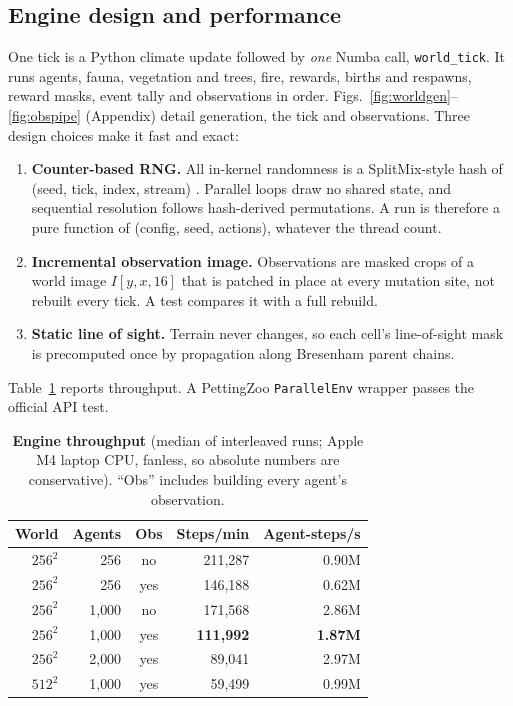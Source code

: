 \documentclass[10pt]{article}
\begin{document}
\subsection{Engine design and performance}
\label{sec:engine}
One tick is a Python climate update followed by \emph{one} Numba \citep{lam2015numba} call, \texttt{world\_tick}. It
runs agents, fauna, vegetation and trees, fire, rewards, births and respawns, reward masks, event tally and
observations in order. Figs.~\ref{fig:worldgen}--\ref{fig:obspipe} (Appendix) detail generation, the tick and observations.
Three design choices make it fast and exact:
\begin{enumerate}
\item \textbf{Counter-based RNG.} All in-kernel randomness is a SplitMix-style hash of
(seed, tick, index, stream) \citep{steele2014splitmix,salmon2011random}. Parallel loops draw no shared state, and
sequential resolution follows hash-derived permutations. A run is therefore a pure function of (config, seed,
actions), whatever the thread count.
\item \textbf{Incremental observation image.} Observations are masked crops of a world image $I[y,x,16]$ that is
patched in place at every mutation site, not rebuilt every tick. A test compares it with a full rebuild.
\item \textbf{Static line of sight.} Terrain never changes, so each cell's line-of-sight mask is precomputed once by
propagation along Bresenham parent chains.
\end{enumerate}
Table~\ref{tab:bench} reports throughput. A PettingZoo \texttt{ParallelEnv} wrapper \citep{terry2021pettingzoo}
passes the official API test.

\begin{table}[t]
\centering\small
\caption{\textbf{Engine throughput} (median of interleaved runs; Apple M4 laptop CPU, fanless, so absolute numbers
are conservative). ``Obs'' includes building every agent's observation.}
\label{tab:bench}
\begin{tabular}{@{}rrcrr@{}}
\toprule
World & Agents & Obs & Steps/min & Agent-steps/s\\
\midrule
$256^2$ & 256 & no & 211{,}287 & 0.90M\\
$256^2$ & 256 & yes & 146{,}188 & 0.62M\\
$256^2$ & 1{,}000 & no & 171{,}568 & 2.86M\\
$256^2$ & 1{,}000 & yes & \textbf{111{,}992} & \textbf{1.87M}\\
$256^2$ & 2{,}000 & yes & 89{,}041 & 2.97M\\
$512^2$ & 1{,}000 & yes & 59{,}499 & 0.99M\\
\bottomrule
\end{tabular}
\end{table}
\end{document}
